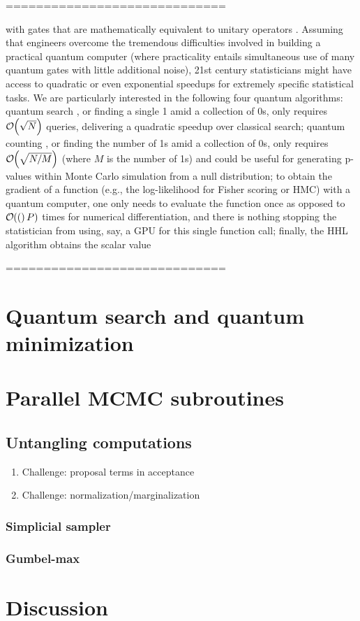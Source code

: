 \documentclass[12pt]{article} %
\newcommand{\order}[1]{{\cal O}\hspace{-0.2em}\left( #1 \right)}
\begin{document}
=============================

 with gates that are mathematically equivalent to unitary operators \citep{nielsen2002quantum}.  Assuming that engineers overcome the tremendous difficulties involved in building a practical quantum computer (where practicality entails simultaneous use of many quantum gates with little additional noise), 21st century statisticians might have access to quadratic or even exponential speedups for extremely specific statistical tasks.  We are particularly interested in the following four quantum algorithms: quantum search \citep{grover1996fast}, or finding a single 1 amid a collection of 0s, only requires $\order{\sqrt{N}}$ queries, delivering a quadratic speedup over classical search; quantum counting \citep{boyer1998tight}, or finding the number of 1s amid a collection of 0s, only requires $\order{\sqrt{N/M}}$ (where $M$ is the number of 1s) and could be useful for generating p-values within Monte Carlo simulation from a null distribution; to obtain the gradient of a function (e.g., the log-likelihood for Fisher scoring or HMC) with a quantum computer, one only needs to evaluate the function once \citep{jordan2005fast} as opposed to $\order(P)$ times for numerical differentiation, and there is nothing stopping the statistician from using, say, a GPU for this single function call; finally, the HHL algorithm \citep{harrow2009quantum} obtains the scalar value 

=============================

\section{Quantum search and quantum minimization}


\section{Parallel MCMC subroutines}

\subsection{Untangling computations}

\begin{enumerate}
	\item Challenge: proposal terms in acceptance
	\item Challenge: normalization/marginalization
\end{enumerate}

\subsubsection{Simplicial sampler}

\subsubsection{Gumbel-max}



\section{Discussion}




\appendix




\end{document}

